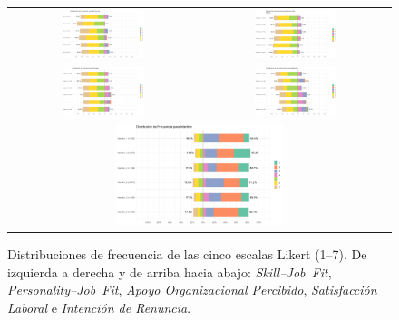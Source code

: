 \begin{figure}[htbp]
\centering
\begin{tabular}{cc}
\includegraphics[width=0.45\textwidth]{figures/distribucion_frecuencia_skill.png} & \includegraphics[width=0.45\textwidth]{figures/distribucion_frecuencia_personality.png} \\
\includegraphics[width=0.45\textwidth]{figures/distribucion_frecuencia_Support.png} & \includegraphics[width=0.45\textwidth]{figures/distribucion_frecuencia_satisfaction.png} \\
\multicolumn{2}{c}{\includegraphics[width=0.45\textwidth]{figures/distribucion_frecuencia_Intention.png}}
\end{tabular}
\caption{Distribuciones de frecuencia de las cinco escalas Likert (1–7). De izquierda a derecha y de arriba hacia abajo: \emph{Skill--Job Fit}, \emph{Personality--Job Fit}, \emph{Apoyo Organizacional Percibido}, \emph{Satisfacción Laboral} e \emph{Intención de Renuncia}.}
\label{fig:histogramas}
\end{figure}

